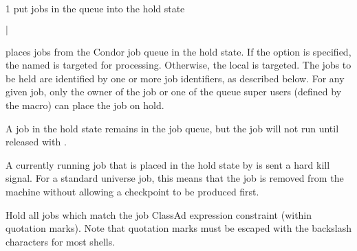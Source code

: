 \begin{ManPage}{\label{man-condor-hold}}{1}
{put jobs in the queue into the hold state}
\Synopsis {}
\ToolArgsBase

\ToolDebugOption
{}
\ToolLocate 
\ToolJobs
$|$  \Dots 

\ToolDebugOption
{}
\ToolLocate 
\ToolAll


\Description

 places jobs from the Condor job queue in
the hold state.
If the  option is specified, the named  is targeted
for processing.  
Otherwise, the local  is targeted.
The jobs to be held are identified by one or more job identifiers, as
described below.
For any given job, only the owner of the job or one of the queue super users
(defined by the  macro) can place the job on hold.

A job in the hold state remains in the job queue,
but the job will not run until released with .

A currently running job that is placed in the hold state by 
is sent a hard kill signal.
For a standard universe job,
this means that the job is removed from the machine without
allowing a checkpoint to be produced first.

\begin{Options}

  \ToolArgsBaseDesc
  \ToolLocateDesc
  \ToolDebugDesc
   {Hold all jobs which match
    the job ClassAd expression constraint (within quotation
    marks).
    Note that quotation marks must be escaped with the
    backslash characters for most shells.  }


\end{Options}
\end{ManPage}

